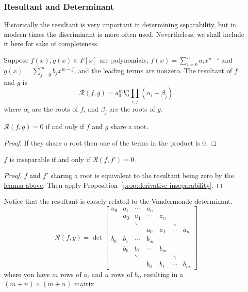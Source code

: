 \subsubsection*{Resultant and Determinant}

\begin{remark}
    Historically the resultant is very important in determining separability,
    but in modern times the discriminant is more often used.
    Nevertheless, we shall include it here for sake of completeness.
\end{remark}
\begin{definition}
    Suppose \(f(x),g(x) \in F[x]\) are polynomials;
    \(f(x) = \sum_{i=0}^n a_i x^{n-i}\) and \(g(x) = \sum_{j=0}^m b_j x^{m-j}\),
    and the leading terms are nonzero.
    The resultant of \(f\) and \(g\) is
    \begin{equation*}
        \mathcal{R}(f,g) = a_0^m b_0^n \prod_{i,j} (\alpha_i - \beta_j)
    \end{equation*}
    where \(\alpha_i\) are the roots of \(f\),
    and \(\beta_j\) are the roots of \(g\).
\end{definition}
\begin{lemma}\label{lem:resultant-zero}
    \(\mathcal{R}(f,g) = 0\) if and only if \(f\) and \(g\) share a root.
\end{lemma}
\begin{proof}
    If they share a root then one of the terms in the product is 0.
\end{proof}
\begin{corollary}
    \(f\) is inseparable if and only if \(\mathcal{R}(f,f') = 0\).
\end{corollary}
\begin{proof}
    \(f\) and \(f'\) sharing a root is equivalent to
    the resultant being zero by the \hyperref[lem:resultant-zero]{lemma above}.
    Then apply Proposition~\ref{prop:derivative-inseparability}.
\end{proof}
\begin{remark}
    Notice that the resultant is closely related to the Vandermonde determinant.
    \begin{equation*}
        \mathcal{R}(f,g) = \det
        \begin{bmatrix}
            a_0 & a_1 & \cdots & a_n \\
            & a_0 & a_1 & \cdots & a_n \\
            & & \ddots & & & \ddots \\
            & & & a_0 & a_1 & \cdots & a_n \\
            b_0 & b_1 & \cdots & b_m \\
            & b_0 & b_1 & \cdots & b_m \\
            & & \ddots & & & \ddots \\
            & & & b_0 & b_1 & \cdots & b_m
        \end{bmatrix}
    \end{equation*}
    where you have \(m\) rows of \(a_i\) and \(n\) rows of \(b_i\),
    resulting in a \((m+n)\times(m+n)\) matrix.
\end{remark}

